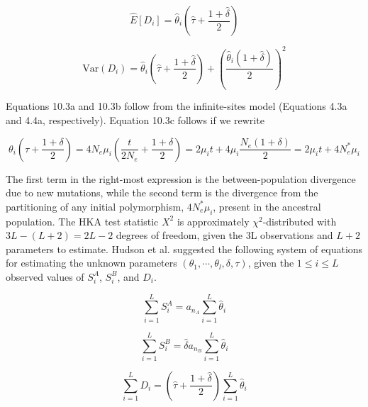 \documentclass{article}
\begin{document}
\begin{equation}
\widehat{E}[D_{i}]=\widehat{\theta}_{i}\left(\widehat{\tau}+\frac{1+\widehat{\delta}}{2}\right)
\tag{10.3c}
\label{eq:10_3c}
\end{equation}

\begin{equation}
\mathrm{Var}(D_{i})=\widehat{\theta}_{i}\left(\widehat{\tau}+\frac{1+\widehat{\delta}}{2}\right)+\left(\frac{\widehat{\theta}_{i}(1+\widehat{\delta})}{2}\right)^{2}
\tag{10.3d}
\label{eq:10_3d}
\end{equation}

Equations 10.3a and 10.3b follow from the infinite-sites model (Equations 4.3a and 4.4a, respectively). Equation 10.3c follows if we rewrite

\begin{equation}
\theta_{i}\left(\tau+\frac{1+\delta}{2}\right)=4N_{e}\mu_{i}\left(\frac{t}{2N_{e}}+\frac{1+\delta}{2}\right)=2\mu_{i}t+4\mu_{i}\frac{N_{e}(1+\delta)}{2}=2\mu_{i}t+4N_{e}^{*}\mu_{i}
\end{equation}

The first term in the right-most expression is the between-population divergence due to new mutations, while the second term is the divergence from the partitioning of any initial polymorphism,  $ 4N_e^* \mu_i $, present in the ancestral population. The HKA test statistic  $ X^2 $ is approximately  $ \chi^2 $-distributed with  $ 3L - (L + 2) = 2L - 2 $ degrees of freedom, given the 3L observations and  $ L + 2 $ parameters to estimate. Hudson et al. suggested the following system of equations for estimating the unknown parameters  $ (\theta_1, \cdots, \theta_l, \delta, \tau) $, given the  $ 1 \leq i \leq L $ observed values of  $ S_i^A $,  $ S_i^B $, and  $ D_i $.

\begin{equation}
\sum_{i=1}^{L}S_{i}^{A}=a_{n_{A}}\sum_{i=1}^{L}\widehat{\theta}_{i}
\tag{10.4a}
\label{eq:10_4a}
\end{equation}

\begin{equation}
\sum_{i=1}^{L}S_{i}^{B}=\widehat{\delta}a_{n_{B}}\sum_{i=1}^{L}\widehat{\theta}_{i}
\tag{10.4b}
\label{eq:10_4b}
\end{equation}

\begin{equation}
\sum_{i=1}^{L}D_{i}=\left(\widehat{\tau}+\frac{1+\widehat{\delta}}{2}\right)\sum_{i=1}^{L}\widehat{\theta}_{i}
\tag{10.4c}
\label{eq:10_4c}
\end{equation}
\end{document}
